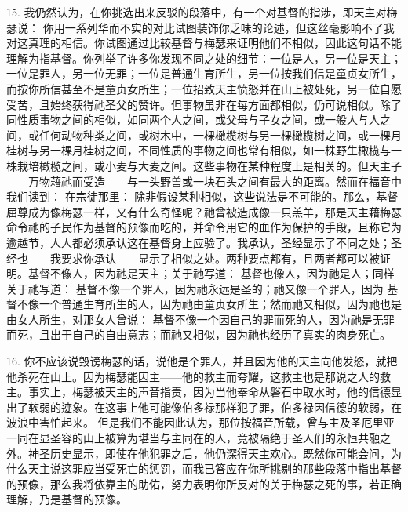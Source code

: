 15. 我仍然认为，在你挑选出来反驳的段落中，有一个对基督的指涉，即天主对梅瑟说：  你用一系列华而不实的对比试图装饰你乏味的论述，但这丝毫影响不了我对这真理的相信。你试图通过比较基督与梅瑟来证明他们不相似，因此这句话不能理解为指基督。你列举了许多你发现不同之处的细节：一位是人，另一位是天主；一位是罪人，另一位无罪；一位是普通生育所生，另一位按我们信是童贞女所生，而按你所信甚至不是童贞女所生；一位招致天主愤怒并在山上被处死，另一位自愿受苦，且始终获得祂圣父的赞许。但事物虽非在每方面都相似，仍可说相似。除了同性质事物之间的相似，如同两个人之间，或父母与子女之间，或一般人与人之间，或任何动物种类之间，或树木中，一棵橄榄树与另一棵橄榄树之间，或一棵月桂树与另一棵月桂树之间，不同性质的事物之间也常有相似，如一株野生橄榄与一株栽培橄榄之间，或小麦与大麦之间。这些事物在某种程度上是相关的。但天主子——万物藉祂而受造——与一头野兽或一块石头之间有最大的距离。然而在福音中我们读到：  在宗徒那里：  除非假设某种相似，这些说法是不可能的。那么，基督屈尊成为像梅瑟一样，又有什么奇怪呢？祂曾被造成像一只羔羊，那是天主藉梅瑟命令祂的子民作为基督的预像而吃的，并命令用它的血作为保护的手段，且称它为逾越节，人人都必须承认这在基督身上应验了。我承认，圣经显示了不同之处；圣经也——我要求你承认——显示了相似之处。两种要点都有，且两者都可以被证明。基督不像人，因为祂是天主；关于祂写道：  基督也像人，因为祂是人；同样关于祂写道：  基督不像一个罪人，因为祂永远是圣的；祂又像一个罪人，因为  基督不像一个普通生育所生的人，因为祂由童贞女所生；然而祂又相似，因为祂也是由女人所生，对那女人曾说：  基督不像一个因自己的罪而死的人，因为祂是无罪而死，且出于自己的自由意志；而祂又相似，因为祂也经历了真实的肉身死亡。\par

16. 你不应该说毁谤梅瑟的话，说他是个罪人，并且因为他的天主向他发怒，就把他杀死在山上。因为梅瑟能因主——他的救主而夸耀，这救主也是那说之人的救主。事实上，梅瑟被天主的声音指责，因为当他奉命从磐石中取水时，他的信德显出了软弱的迹象。在这事上他可能像伯多禄那样犯了罪，伯多禄因信德的软弱，在波浪中害怕起来。 但是我们不能因此认为，那位按福音所载，曾与主及圣厄里亚一同在显圣容的山上被算为堪当与主同在的人，竟被隔绝于圣人们的永恒共融之外。神圣历史显示，即使在他犯罪之后，他仍深得天主欢心。既然你可能会问，为什么天主说这罪应当受死亡的惩罚，而我已答应在你所挑剔的那些段落中指出基督的预像，那么我将依靠主的助佑，努力表明你所反对的关于梅瑟之死的事，若正确理解，乃是基督的预像。\par

